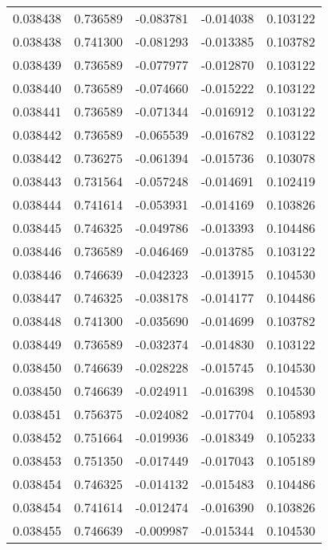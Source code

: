 \begin{tabular}{lrrrr}
0.038438    &  0.736589 & -0.083781 & -0.014038 &             0.103122 \\
0.038438    &  0.741300 & -0.081293 & -0.013385 &             0.103782 \\
0.038439    &  0.736589 & -0.077977 & -0.012870 &             0.103122 \\
0.038440    &  0.736589 & -0.074660 & -0.015222 &             0.103122 \\
0.038441    &  0.736589 & -0.071344 & -0.016912 &             0.103122 \\
0.038442    &  0.736589 & -0.065539 & -0.016782 &             0.103122 \\
0.038442    &  0.736275 & -0.061394 & -0.015736 &             0.103078 \\
0.038443    &  0.731564 & -0.057248 & -0.014691 &             0.102419 \\
0.038444    &  0.741614 & -0.053931 & -0.014169 &             0.103826 \\
0.038445    &  0.746325 & -0.049786 & -0.013393 &             0.104486 \\
0.038446    &  0.736589 & -0.046469 & -0.013785 &             0.103122 \\
0.038446    &  0.746639 & -0.042323 & -0.013915 &             0.104530 \\
0.038447    &  0.746325 & -0.038178 & -0.014177 &             0.104486 \\
0.038448    &  0.741300 & -0.035690 & -0.014699 &             0.103782 \\
0.038449    &  0.736589 & -0.032374 & -0.014830 &             0.103122 \\
0.038450    &  0.746639 & -0.028228 & -0.015745 &             0.104530 \\
0.038450    &  0.746639 & -0.024911 & -0.016398 &             0.104530 \\
0.038451    &  0.756375 & -0.024082 & -0.017704 &             0.105893 \\
0.038452    &  0.751664 & -0.019936 & -0.018349 &             0.105233 \\
0.038453    &  0.751350 & -0.017449 & -0.017043 &             0.105189 \\
0.038454    &  0.746325 & -0.014132 & -0.015483 &             0.104486 \\
0.038454    &  0.741614 & -0.012474 & -0.016390 &             0.103826 \\
0.038455    &  0.746639 & -0.009987 & -0.015344 &             0.104530 \\

\end{tabular}
